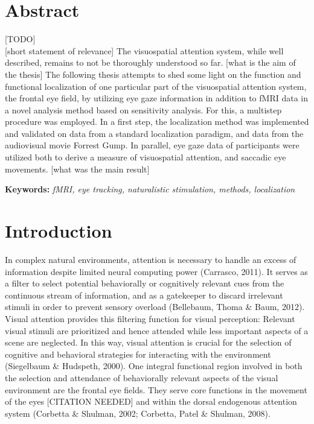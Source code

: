 \documentclass[a4paper, 11pt]{scrreprt}
\begin{document}
\clearpage

\setcounter{page}{1}	%


\chapter*{Abstract}

[TODO] \\

[short statement of relevance]
The visuospatial attention system, while well described, remains to not be thoroughly understood so far. 
[what is the aim of the thesis]
The following thesis attempts to shed some light on the function and functional localization of one particular part of the visuospatial attention system, the frontal eye field, by utilizing eye gaze information in addition to fMRI data in a novel analysis method based on sensitivity analysis. 
For this, a multistep procedure was employed. 
In a first step, the localization method was implemented and validated on data from a standard localization paradigm, and data from the audiovisual movie Forrest Gump.
In parallel, eye gaze data of participants were utilized both to derive a measure of visuospatial attention, and saccadic eye movements.
[what was the main result]

\bigskip

\textbf{Keywords:} \textit{fMRI, eye tracking, naturalistic stimulation, methods, localization}



\chapter{Introduction}

In complex natural environments, attention is necessary to handle an excess of information despite limited neural computing power (Carrasco, 2011). It serves as a filter to select potential behaviorally or cognitively relevant cues from the continuous stream of information, and as a gatekeeper to discard irrelevant stimuli in order to prevent sensory overload (Bellebaum, Thoma \& Baum, 2012). Visual attention provides this filtering function for visual perception: Relevant visual stimuli are prioritized and hence attended while less important aspects of a scene are neglected. In this way, visual attention is crucial for the selection of cognitive and behavioral strategies for interacting with the environment (Siegelbaum \& Hudspeth, 2000).
\newline
One integral functional region involved in both the selection and attendance of behaviorally relevant aspects of the visual environment are the frontal eye fields. They serve core functions in the movement of the eyes [CITATION NEEDED] and within the dorsal endogenous attention system (Corbetta \& Shulman, 2002; Corbetta, Patel \& Shulman, 2008). 
\end{document}
